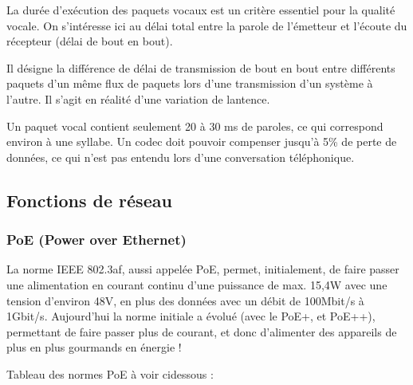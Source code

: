 \documentclass[letterpaper,10pt,french]{sphinxmanual}
\begin{document}
\sphinxAtStartPar
{}

\sphinxAtStartPar
La durée d’exécution des paquets vocaux est un critère essentiel pour la qualité vocale. On s’intéresse ici au délai total entre la parole de l’émetteur et l’écoute du récepteur (délai de bout en bout).

\noindent{}

\sphinxAtStartPar


\sphinxAtStartPar
{}

\sphinxAtStartPar
Il désigne la différence de délai de transmission de bout en bout entre différents paquets d’un même flux de paquets lors d’une transmission d’un système à l’autre.
Il s’agit en réalité d’une variation de lantence.

\noindent{}

\sphinxAtStartPar


\sphinxAtStartPar
{}

\sphinxAtStartPar
Un paquet vocal contient seulement 20 à 30 ms de paroles, ce qui correspond environ à une syllabe. Un codec doit pouvoir compenser jusqu’à 5\% de perte de données, ce qui n’est pas entendu lors d’une conversation téléphonique.

\noindent{}


\subsection{Fonctions de réseau}
\label{\detokenize{Documentation-M362:fonctions-de-reseau}}

\subsubsection{PoE (Power over Ethernet)}
\label{\detokenize{Documentation-M362:poe-power-over-ethernet}}
\sphinxAtStartPar
La norme IEEE 802.3af, aussi appelée PoE, permet, initialement, de faire passer une alimentation en courant continu d’une puissance de max. 15,4W avec une tension d’environ 48V, en plus des données avec un débit de 100Mbit/s à 1Gbit/s.
Aujourd’hui la norme initiale a évolué (avec le PoE+, et PoE++), permettant de faire passer plus de courant, et donc d’alimenter des appareils de plus en plus gourmands en énergie !

\sphinxAtStartPar
Tableau des normes PoE à voir ci\sphinxhyphen{}dessous :
\end{document}
